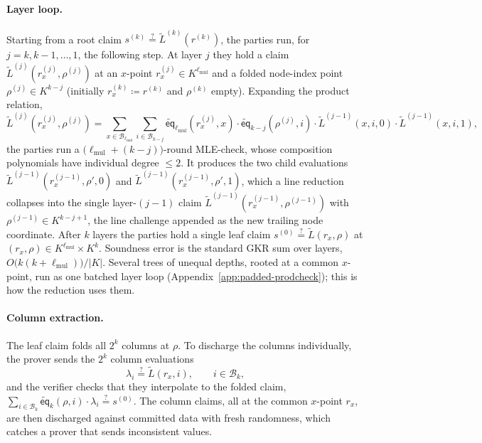 \documentclass{article}
\theoremstyle{definition}
\newcommand*{\mle}{\widetilde}
\newcommand{\eq}{\mathsf{eq}}
\newcommand{\BB}{\mathcal{B}}
\begin{document}
\paragraph{Layer loop.}
Starting from a root claim $s^{(k)} \stackrel{?}{=} \mle{L}^{(k)}(r^{(k)})$, the parties run, for $j = k, k - 1, \ldots, 1$, the following step. At layer $j$ they hold a claim $\mle{L}^{(j)}(r_x^{(j)}, \rho^{(j)})$ at an $x$-point $r_x^{(j)} \in K^{\ell_\text{mul}}$ and a folded node-index point $\rho^{(j)} \in K^{k - j}$ (initially $r_x^{(k)} \coloneqq r^{(k)}$ and $\rho^{(k)}$ empty). Expanding the product relation,
\[
  \mle{L}^{(j)}(r_x^{(j)}, \rho^{(j)}) = \sum_{x \in \BB_{\ell_\text{mul}}} \sum_{i \in \BB_{k - j}} \mle{\eq}_{\ell_\text{mul}}(r_x^{(j)}, x) \cdot \mle{\eq}_{k - j}(\rho^{(j)}, i) \cdot \mle{L}^{(j - 1)}(x, i, 0) \cdot \mle{L}^{(j - 1)}(x, i, 1),
\]
the parties run a $\bigl( \ell_\text{mul} + (k - j) \bigr)$-round MLE-check, whose composition polynomials have individual degree $\leq 2$. It produces the two child evaluations $\mle{L}^{(j - 1)}(r_x^{(j - 1)}, \rho', 0)$ and $\mle{L}^{(j - 1)}(r_x^{(j - 1)}, \rho', 1)$, which a line reduction~\cite{Goldwasser:2015aa} collapses into the single layer-$(j - 1)$ claim $\mle{L}^{(j - 1)}(r_x^{(j - 1)}, \rho^{(j - 1)})$ with $\rho^{(j - 1)} \in K^{k - j + 1}$, the line challenge appended as the new trailing node coordinate. After $k$ layers the parties hold a single leaf claim $s^{(0)} \stackrel{?}{=} \mle{L}(r_x, \rho)$ at $(r_x, \rho) \in K^{\ell_\text{mul}} \times K^k$. Soundness error is the standard GKR sum over layers, $O\bigl( k(k + \ell_\text{mul}) \bigr) / |K|$. Several trees of unequal depths, rooted at a common $x$-point, run as one batched layer loop (Appendix~\ref{app:padded-prodcheck}); this is how the reduction uses them.

\paragraph{Column extraction.}
The leaf claim folds all $2^k$ columns at $\rho$. To discharge the columns individually, the prover sends the $2^k$ column evaluations
\[
  \lambda_i \stackrel{?}{=} \mle{L}(r_x, i), \qquad i \in \BB_k,
\]
and the verifier checks that they interpolate to the folded claim, $\sum_{i \in \BB_k} \mle{\eq}_k(\rho, i) \cdot \lambda_i \stackrel{?}{=} s^{(0)}$. The column claims, all at the common $x$-point $r_x$, are then discharged against committed data with fresh randomness, which catches a prover that sends inconsistent values.
\end{document}
